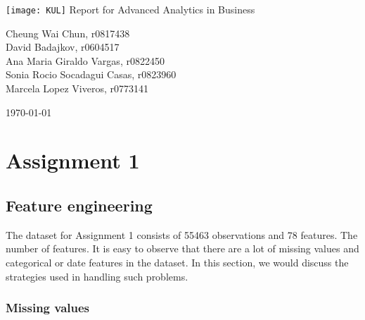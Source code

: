 \documentclass[12pt]{article}
\begin{document}
\begin{titlepage}
	\begin{center}
	\vspace*{1cm}
    \texttt{[image: KUL]}
	\vspace{2.5cm}
    {\Large Report for Advanced Analytics in Business}
            
    \vspace{1.5cm}

    {\large Cheung Wai Chun, r0817438}\\
    \vspace{0.5cm}
    {\large David Badajkov, r0604517}\\
    \vspace{0.5cm}
    {\large Ana Maria Giraldo Vargas, r0822450}\\
    \vspace{0.5cm}
	{\large Sonia Rocio 	Socadagui Casas, r0823960}\\
	\vspace{0.5cm}
	{\large Marcela 	Lopez Viveros, r0773141}
	\vspace{1.5cm}

       \today
   \end{center}
\end{titlepage}

\newpage
\tableofcontents
\newpage

\section*{Assignment 1}


\subsection*{Feature engineering}

The dataset for Assignment 1 consists of 55463 observations and 78 features. The number of features. It is easy to observe that there are a lot of missing values and categorical or date features in the dataset. In this section, we would discuss the strategies used in handling such problems. 

\subsubsection*{Missing values}
\end{document}
